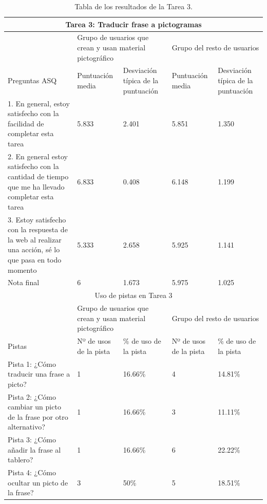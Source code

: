 \begin{table}
\begin{tabular}{ |p{4cm}|p{2cm}|p{2cm}|p{2cm}|p{2cm}|  }
	\hline
	\multicolumn{5}{|c|}{Tarea 3: Traducir frase a pictogramas} \\
	\hline
	& \multicolumn{2}{p{4cm}|}{Grupo de usuarios que crean y usan material pictográfico} & \multicolumn{2}{p{4cm}|}{Grupo del resto de usuarios }  \\ 
	\hline
	Preguntas ASQ & Puntuación media  &Desviación típica de la puntuación & Puntuación media & Desviación típica de la puntuación\\
	\hline
	1. En general, estoy satisfecho con la facilidad de completar esta tarea &5.833  &2.401 &5.851  &1.350\\
	\hline
	2. En general estoy satisfecho con la cantidad de tiempo que me ha llevado completar esta tarea &6.833  &0.408 &6.148 &1.199\\
	\hline
	3. Estoy satisfecho con la respuesta de la web al realizar una acción, sé lo que pasa en todo momento &5.333 &2.658 &5.925  &1.141\\
	\hline
	Nota final &6 &1.673 &5.975 &1.025\\
	\hline
	\multicolumn{5}{|c|}{Uso de pistas en Tarea 3} \\
	\hline
	& \multicolumn{2}{p{4cm}|}{Grupo de usuarios que crean y usan material pictográfico} & \multicolumn{2}{p{4cm}|}{Grupo del resto de usuarios }  \\ 
	\hline
	Pistas &Nº de usos de la pista &\% de uso de la pista&Nº de usos de la pista&\% de uso de la pista\\
	\hline
	Pista 1: ¿Cómo traducir una frase a picto? &1  &16.66\% &4  &14.81\%\\
	\hline
	Pista 2: ¿Cómo cambiar un picto de la frase por otro alternativo? &1  &16.66\%  &3 &11.11\%\\
	\hline
	Pista 3: ¿Cómo añadir la frase al tablero? &1 &16.66\% &6   &22.22\%\\
	\hline
	Pista 4: ¿Cómo ocultar un picto de la frase? &3 &50\% &5   &18.51\%\\
	\hline

\end{tabular}
\caption{\label{tab:area3respuestas}Tabla de los resultados de la Tarea 3.}
\end{table}


